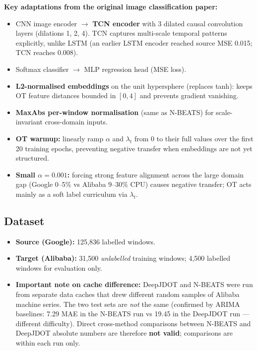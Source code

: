 \documentclass[12pt,a4paper]{article}
\begin{document}
\textbf{Key adaptations from the original image classification paper:}
\begin{itemize}
  \item CNN image encoder $\to$ \textbf{TCN encoder} with 3 dilated causal convolution
        layers (dilations 1, 2, 4).  TCN captures multi-scale temporal patterns
        explicitly, unlike LSTM (an earlier LSTM encoder reached source MSE 0.015;
        TCN reaches 0.008).
  \item Softmax classifier $\to$ MLP regression head (MSE loss).
  \item \textbf{L2-normalised embeddings} on the unit hypersphere (replaces tanh):
        keeps OT feature distances bounded in $[0, 4]$ and prevents gradient vanishing.
  \item \textbf{MaxAbs per-window normalisation} (same as N-BEATS) for scale-invariant
        cross-domain inputs.
  \item \textbf{OT warmup:} linearly ramp $\alpha$ and $\lambda_t$ from 0 to their
        full values over the first 20 training epochs, preventing negative transfer
        when embeddings are not yet structured.
  \item \textbf{Small $\alpha = 0.001$:} forcing strong feature alignment across
        the large domain gap (Google 0--5\% vs Alibaba 9--30\% CPU) causes negative
        transfer; OT acts mainly as a soft label curriculum via $\lambda_t$.
\end{itemize}

\subsection{Dataset}

\begin{itemize}
  \item \textbf{Source (Google):} 125,836 labelled windows.
  \item \textbf{Target (Alibaba):} 31,500 \emph{unlabelled} training windows;
        4,500 labelled windows for evaluation only.
  \item \textbf{Important note on cache difference:} DeepJDOT and N-BEATS were run
        from separate data caches that drew different random samples of Alibaba machine
        series.  The two test sets are \emph{not} the same (confirmed by ARIMA baselines:
        7.29 MAE in the N-BEATS run vs 19.45 in the DeepJDOT run --- different difficulty).
        Direct cross-method comparisons between N-BEATS and DeepJDOT absolute numbers
        are therefore \textbf{not valid}; comparisons are within each run only.
\end{itemize}
\end{document}
